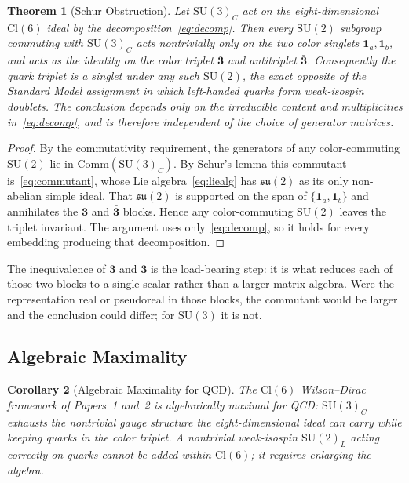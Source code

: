 \documentclass[12pt]{article}
\newtheorem{theorem}{Theorem}[section]
\newtheorem{corollary}[theorem]{Corollary}
\theoremstyle{remark}
\newcommand{\cl}{\mathrm{Cl}}
\newcommand{\su}{\mathrm{SU}}
\newcommand{\Comm}{\mathrm{Comm}}
\begin{document}
\begin{theorem}[Schur Obstruction]
	\label{thm:schur}
	Let $\su(3)_C$ act on the eight-dimensional $\cl(6)$ ideal by the
	decomposition~\eqref{eq:decomp}.  Then every $\su(2)$ subgroup commuting
	with $\su(3)_C$ acts nontrivially only on the two color singlets
	$\mathbf{1}_a,\mathbf{1}_b$, and acts as the identity on the color triplet
	$\mathbf{3}$ and antitriplet $\bar{\mathbf{3}}$.  Consequently the quark
	triplet is a singlet under any such $\su(2)$, the exact opposite of the
	Standard Model assignment in which left-handed quarks form weak-isospin
	doublets.  The conclusion depends only on the irreducible content and
	multiplicities in~\eqref{eq:decomp}, and is therefore independent of the
	choice of generator matrices.
\end{theorem}

\begin{proof}
	By the commutativity requirement, the generators of any color-commuting
	$\su(2)$ lie in $\Comm(\su(3)_C)$.  By Schur's lemma this commutant
	is~\eqref{eq:commutant}, whose Lie algebra~\eqref{eq:liealg} has
	$\mathfrak{su}(2)$ as its only non-abelian simple ideal.  That
	$\mathfrak{su}(2)$ is supported on the span of
	$\{\mathbf{1}_a,\mathbf{1}_b\}$ and annihilates the $\mathbf{3}$ and
	$\bar{\mathbf{3}}$ blocks.  Hence any color-commuting $\su(2)$ leaves the
	triplet invariant.  The argument uses only~\eqref{eq:decomp}, so it holds
	for every embedding producing that decomposition.
\end{proof}

The inequivalence of $\mathbf{3}$ and $\bar{\mathbf{3}}$ is the load-bearing
step: it is what reduces each of those two blocks to a single scalar rather than
a larger matrix algebra.  Were the representation real or pseudoreal in those
blocks, the commutant would be larger and the conclusion could differ; for
$\su(3)$ it is not.

\subsection{Algebraic Maximality}
\label{sec:maximality}

\begin{corollary}[Algebraic Maximality for QCD]
	\label{cor:maximal}
	The $\cl(6)$ Wilson--Dirac framework of Papers~1 and~2 is algebraically
	maximal for QCD: $\su(3)_C$ exhausts the nontrivial gauge structure the
	eight-dimensional ideal can carry while keeping quarks in the color
	triplet.  A nontrivial weak-isospin $\su(2)_L$ acting correctly on quarks
	cannot be added within $\cl(6)$; it requires enlarging the algebra.
\end{corollary}
\end{document}
